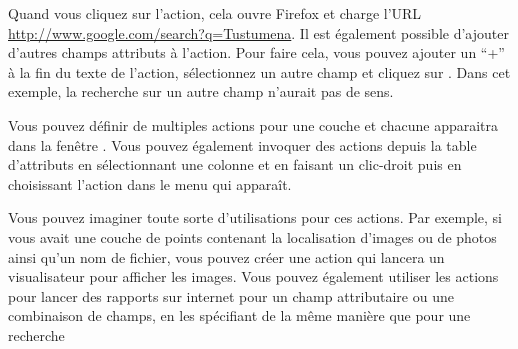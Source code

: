 Quand vous cliquez sur l'action, cela ouvre Firefox et charge l'URL \url{http://www.google.com/search?q=Tustumena}. Il est également possible d'ajouter d'autres champs attributs à l'action. Pour faire cela, vous pouvez ajouter un ``+'' à la fin du texte de l'action, sélectionnez un autre champ et cliquez sur . Dans cet exemple, la recherche sur un autre champ n'aurait pas de sens.

Vous pouvez définir de multiples actions pour une couche et chacune apparaitra dans la fenêtre . Vous pouvez également invoquer des actions depuis la table d'attributs en sélectionnant une colonne et en faisant un clic-droit puis en choisissant l'action dans le menu qui apparaît.

Vous pouvez imaginer toute sorte d'utilisations pour ces actions. Par exemple, si vous avait une couche de points contenant la localisation d'images ou de photos ainsi qu'un nom de fichier, vous pouvez créer une action qui lancera un visualisateur pour afficher les images. Vous pouvez également utiliser les actions pour lancer des rapports sur internet pour un champ attributaire ou une combinaison de champs, en les spécifiant de la même manière que pour une recherche


